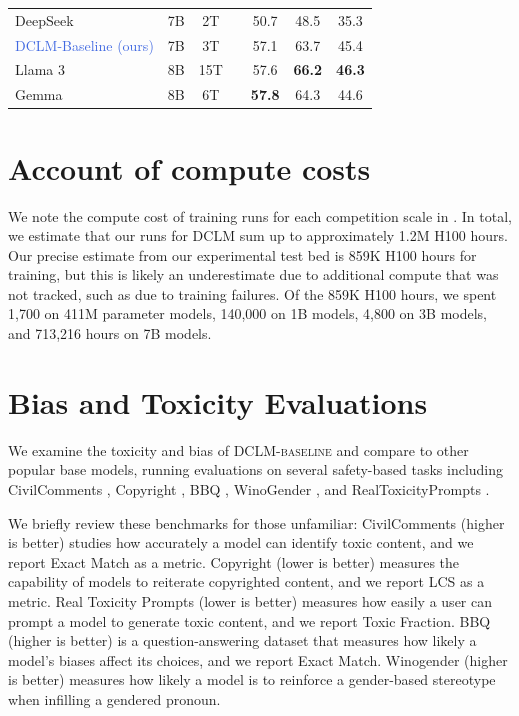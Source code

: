 \documentclass{article}
\newcommand{\cmark}{\ding{51}}
\newcommand{\xmark}{\ding{55}}
\newcommand{\dclm}{\textsc{DCLM}\xspace}
\newcommand{\hqpool}{\textsc{DCLM-baseline}\xspace}
\begin{document}
\begin{table}
\begin{tabular}{lcccccc}
DeepSeek & 7B & 2T & \textcolor{red}{\xmark} & 50.7 & 48.5 & 35.3 \\
\textcolor{RoyalBlue}{DCLM-Baseline (ours)} & 7B & 3T & \textcolor{nicergreen}{\cmark} & 57.1 & 63.7 & 45.4 \\
Llama 3 & 8B & 15T & \textcolor{red}{\xmark} & 57.6 & \textbf{66.2} & \textbf{46.3} \\
Gemma & 8B & 6T & \textcolor{red}{\xmark} & \textbf{57.8} & 64.3 & 44.6 \\\bottomrule
\end{tabular}
\endgroup
    \label{tab:fig-1-table-version}
\end{table}

\section{Account of compute costs}\label{appx:compute-cost}

We note the compute cost of training runs for each competition scale in .
In total, we estimate that our runs for \dclm sum up to approximately 1.2M H100 hours. Our precise estimate from our experimental test bed is 859K H100 hours for training, but this is likely an underestimate due to additional compute that was not tracked, such as due to training failures.
Of the 859K H100 hours, we spent 1,700 on 411M parameter models, 140,000 on 1B models, 4,800 on 3B models, and 713,216 hours on 7B models.

\section{Bias and Toxicity Evaluations}\label{appx:toxicity}

We examine the toxicity and bias of \hqpool and compare to other popular base models, running evaluations on several safety-based tasks including CivilComments \citep{borkan2019nuanced}, Copyright \citep{carlini2021extracting}, BBQ \citep{bbq}, WinoGender \citep{winogender}, and  RealToxicityPrompts \citep{gehman2020realtoxicityprompts}.

We briefly review these benchmarks for those unfamiliar: CivilComments (higher is better) studies how accurately a model can identify toxic content, and we report Exact Match as a metric. Copyright (lower is better) measures the capability of models to reiterate copyrighted content, and we report LCS as a metric. Real Toxicity Prompts (lower is better) measures how easily a user can prompt a model to generate toxic content, and we report Toxic Fraction. BBQ (higher is better) is a question-answering dataset that measures how likely a model’s biases affect its choices, and we report Exact Match. Winogender (higher is better) measures how likely a model is to reinforce a gender-based stereotype when infilling a gendered pronoun.
\end{document}
